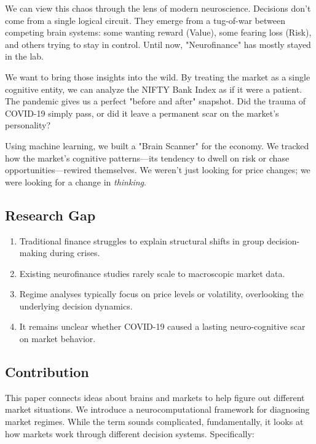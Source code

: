 \documentclass[conference]{IEEEtran}
\begin{document}
We can view this chaos through the lens of modern neuroscience. Decisions don't come from a single logical circuit. They emerge from a tug-of-war between competing brain systems: some wanting reward (Value), some fearing loss (Risk), and others trying to stay in control. Until now, "Neurofinance" has mostly stayed in the lab.

We want to bring those insights into the wild. By treating the market as a single cognitive entity, we can analyze the NIFTY Bank Index as if it were a patient. The pandemic gives us a perfect "before and after" snapshot. Did the trauma of COVID-19 simply pass, or did it leave a permanent scar on the market's personality?

Using machine learning, we built a "Brain Scanner" for the economy. We tracked how the market's cognitive patterns---its tendency to dwell on risk or chase opportunities---rewired themselves. We weren't just looking for price changes; we were looking for a change in \textit{thinking}.


\subsection{Research Gap}
\begin{enumerate}
    \item Traditional finance struggles to explain structural shifts in group decision-making during crises.
    \item Existing neurofinance studies rarely scale to macroscopic market data.
    \item Regime analyses typically focus on price levels or volatility, overlooking the underlying decision dynamics.
    \item It remains unclear whether COVID-19 caused a lasting neuro-cognitive scar on market behavior.
\end{enumerate}

\subsection{Contribution}
This paper connects ideas about brains and markets to help figure out different market situations. We introduce a neurocomputational framework for diagnosing market regimes. While the term sounds complicated, fundamentally, it looks at how markets work through different decision systems. Specifically:
\end{document}
